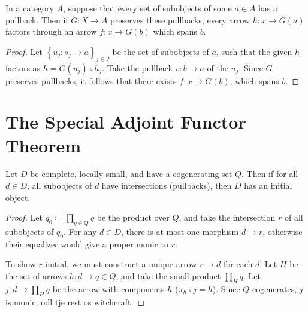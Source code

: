 \begin{lemma}\label{lma:5.3}
	In a category $A$, suppose that every set of subobjects of some $a\in A$ has a pullback. Then if $G : X \to A$ preserves these pullbacks, every arrow $h : x \to G(a)$ factors through an arrow $f : x \to G(b)$ which spans $b$.
\end{lemma}
\begin{proof}
	Let $\left\{ u_j : s_j \to a \right\}_{j\in J} $ be the set of subobjects of $a$, such that the given $h$ factors as $h=G(u_j)\circ h_j$. Take the pullback $v : b \to a$ of the $u_j$. Since $G$ preserves pullbacks, it follows that there exists $f : x \to G(b)$, which spans $b$.
\end{proof}

\section{The Special Adjoint Functor Theorem}

\begin{theorem}\label{thm:5.13}
	Let $D$ be complete, locally small, and have a cogenerating set $Q$. Then if for all $d\in D$, all subobjects of $d$ have intersections (pullbacks), then $D$ has an initial object.
\end{theorem}
\begin{proof}
	Let $q_0\coloneqq \prod_{q\in Q} q$ be the product over $Q$, and take the intersection $r$ of all subobjects of $q_0$. For any $d\in D$, there is at most one morphism $d\to r$, otherwise their equalizer would give a proper monic to $r$.

	To show $r$ initial, we must construct a unique arrow $r\to d$ for each $d$. Let $H$ be the set of arrows $h : d \to q\in Q$, and take the small product $\prod_{H} q$. Let $j : d \to \prod_{H} q$ be the arrow with components $h$ ($\pi_h \circ j=h$). Since $Q$ cogenerates, $j$ is monic, odl tje rest os witchcraft.
\end{proof}

